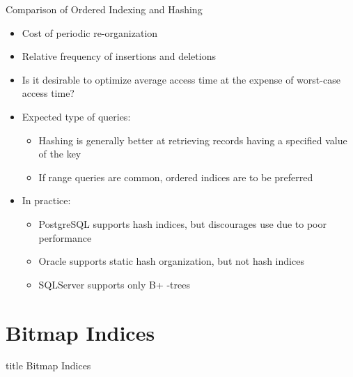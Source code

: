 \documentclass[aspectratio=169, xcolor=dvipsnames]{beamer}
\begin{document}
\begin{frame}{Comparison of Ordered Indexing and Hashing}
    \begin{itemize}[<+->]
        \item Cost of periodic re-organization
        \item Relative frequency of insertions and deletions
        \item Is it desirable to optimize average access time at the expense of worst-case access time?
        \item Expected type of queries:
        \begin{itemize}[<+->]
            \item Hashing is generally better at retrieving records having a specified value of the key
            \item If range queries are common, ordered indices are to be preferred
        \end{itemize}
        \item In practice:
        \begin{itemize}[<+->]
            \item PostgreSQL supports hash indices, but discourages use due to poor performance
            \item Oracle supports static hash organization, but not hash indices
            \item SQLServer supports only B+ -trees
        \end{itemize}
    \end{itemize}
\end{frame}

\section{Bitmap Indices}
\begin{frame}
  \vfill
  \centering
  \begin{beamercolorbox}[sep=8pt,center,shadow=true,rounded=true]{title}
    Bitmap Indices\par%
  \end{beamercolorbox}
  \vfill
\end{frame}
\end{document}

